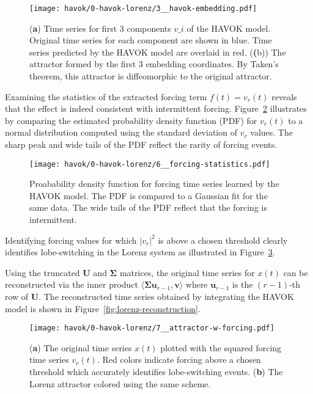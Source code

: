 \begin{figure}[h]
  \centering
  \texttt{[image: havok/0-havok-lorenz/3\_\_havok-embedding.pdf]}
  \caption{(\textbf{a}) Time series for first 3 components $v\_i$ of the HAVOK
    model. Original time series for each component are shown in blue. Time
    series predicted by the HAVOK model are overlaid in red. (\textbf(b)) The
    attractor formed by the first 3 embedding coordinates. By Taken's theorem,
    this attractor is diffeomorphic to the original attractor.}
  \label{fig:lorenz-havok-embedding}
\end{figure}


\newpage

Examining the statistics of the extracted forcing term $f(t)=v_r(t)$ reveals
that the effect is indeed consistent with intermittent forcing.
Figure~\ref{fig:lorenz-forcing-stats} illustrates by comparing the estimated
probability density function (PDF) for $v_r(t)$ to a normal distribution
computed using the standard deviation of $v_r$ values. The sharp peak and wide
tails of the PDF reflect the rarity of forcing events.

\begin{figure}[h]
  \centering
  \texttt{[image: havok/0-havok-lorenz/6\_\_forcing-statistics.pdf]}
  \caption{Proabability density function for forcing time series learned by the
    HAVOK model. The PDF is compared to a Gaussian fit for the same data. The
    wide tails of the PDF reflect that the forcing is intermittent.}
  \label{fig:lorenz-forcing-stats}
\end{figure}

Identifying forcing values for which $\lvert  v_r \rvert^2$ is above a chosen
threshold clearly identifies lobe-switching in the Lorenz system as illustrated
in Figure~\ref{fig:lorenz-attractor-forcing}.

Using the truncated $\mathbf{U}$ and $\mathbf{\Sigma}$ matrices, the original
time series for $x(t)$ can be reconstructed via the inner product
$\langle \mathbf{\Sigma}\mathbf{u}_{r-1}, \mathbf{v} \rangle$ where $\mathbf{u}_{r-1}$ is the $(r-1)$-th row of $\mathbf{U}$. The reconstructed time
series obtained by integrating the HAVOK model is shown in Figure~\ref{fig:lorenz-reconstruction}.

\clearpage
\newpage

\begin{figure}[h]
  \vspace{-1cm}
  \centering
  \texttt{[image: havok/0-havok-lorenz/7\_\_attractor-w-forcing.pdf]}
  \caption{(\textbf{a}) The original time series $x(t)$ plotted with the squared
  forcing time series $v_r(t)$. Red colors indicate forcing above a chosen
  threshold which accurately identifies lobe-switching events. (\textbf{b}) The
  Lorenz attractor colored using the same scheme.}
  \label{fig:lorenz-attractor-forcing}
  \vspace{-0.5cm}
\end{figure}

